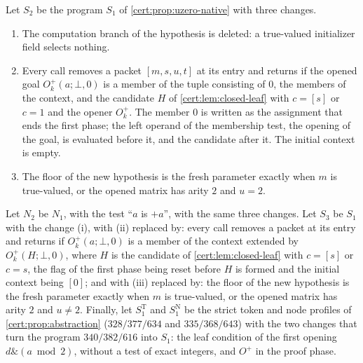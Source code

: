 Let $S_2$ be the program $S_1$ of \cref{cert:prop:uzero-native} with three
changes.
\begin{enumerate}[label=(\roman*)]
\item The computation branch of the hypothesis is deleted: a true-valued
initializer field selects nothing.
\item Every call removes a packet $[m,s,u,t]$ at its entry and returns if the
opened goal $O^{+}_k(a;\bot,0)$ is a member of the tuple consisting of $0$, the
members of the context, and the candidate $H$ of \cref{cert:lem:closed-leaf}
with $c=[s]$ or $c=1$ and the opener $O^{+}_k$. The member $0$ is written as the
assignment that ends the first phase; the left operand of the membership test,
the opening of the goal, is evaluated before it, and the candidate after it.
The initial context is empty.
\item The floor of the new hypothesis is the fresh parameter exactly when $m$
is true-valued, or the opened matrix has arity $2$ and $u=2$.
\end{enumerate}
Let $N_2$ be $N_1$, with the test ``$a$ is $+a$'', with the same three changes.
Let $S_3$ be $S_1$ with the change (i), with (ii) replaced by: every call
removes a packet at its entry and returns if $O^{+}_k(a;\bot,0)$ is a member of
the context extended by $O^{+}_k(H;\bot,0)$, where $H$ is the candidate of
\cref{cert:lem:closed-leaf} with $c=[s]$ or $c=s$, the flag of the first phase
being reset before $H$ is formed and the initial context being $[0]$; and with
(iii) replaced by: the floor of the new hypothesis is the fresh parameter
exactly when $m$ is true-valued, or the opened matrix has arity $2$ and
$u\neq 2$. Finally, let $S^{\mathrm T}_1$ and $S^{\mathrm N}_1$ be the strict token
and node profiles of \cref{cert:prop:abstraction} ($328/377/634$ and
$335/368/643$) with the two changes that turn the program $340/382/616$ into
$S_1$: the leaf condition of the first opening $d\mathbin{\&}(a\bmod 2)$, without a
test of exact integers, and $O^{+}$ in the proof phase.

